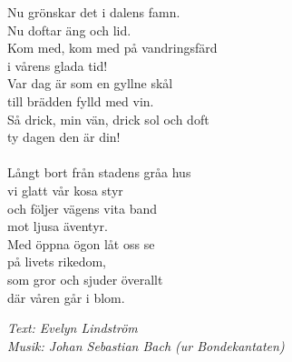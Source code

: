 \vspace{10pt}
Nu grönskar det i dalens famn.\\
Nu doftar äng och lid.\\
Kom med, kom med på vandringsfärd\\
i vårens glada tid!\\
Var dag är som en gyllne skål\\
till brädden fylld med vin.\\
Så drick, min vän, drick sol och doft\\
ty dagen den är din!\\
\\
Långt bort från stadens gråa hus\\
vi glatt vår kosa styr\\
och följer vägens vita band\\
mot ljusa äventyr.\\
Med öppna ögon låt oss se\\
på livets rikedom,\\
som gror och sjuder överallt\\
där våren går i blom.
\par
\vspace{10pt}
{\footnotesize\textit{Text: Evelyn Lindström\\ Musik: Johan Sebastian Bach (ur Bondekantaten)}}
